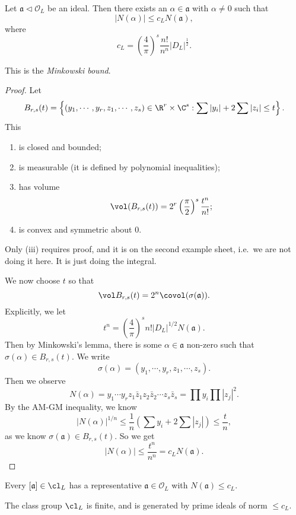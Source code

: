 \documentclass[a4paper]{article}
\begin{document}
\begin{prop}
  Let $\mathfrak{a} \lhd \mathcal{O}_L$ be an ideal. Then there exists an $\alpha \in \mathfrak{a}$ with $\alpha \not= 0$ such that
  \[
    |N(\alpha)| \leq c_L N(\mathfrak{a}),
  \]
  where
  \[
    c_L = \left(\frac{4}{\pi}\right)^s \frac{n!}{n^n} |D_L|^{\frac{1}{2}}.
  \]\qedhere
\end{prop}
This is the \emph{Minkowski bound}.

\begin{proof}
  Let
  \[
    B_{r, s}(t) = \left\{(y_1, \cdots, y_r, z_1, \cdots, z_s) \in \R^r \times \C^s: \sum |y_i| + 2 \sum |z_i| \leq t\right\}.
  \]
  This
  \begin{enumerate}
    \item is closed and bounded;
    \item is measurable (it is defined by polynomial inequalities);
    \item has volume
      \[
        \vol(B_{r, s}(t)) = 2^r \left(\frac{\pi}{2}\right)^s \frac{t^n}{n!};
      \]
    \item is convex and symmetric about $0$.
  \end{enumerate}
  Only (iii) requires proof, and it is on the second example sheet, i.e.\ we are not doing it here. It is just doing the integral.

  We now choose $t$ so that
  \[
    \vol B_{r, s}(t) = 2^n \covol(\sigma(\mathfrak{a})).
  \]
  Explicitly, we let
  \[
    t^n = \left(\frac{4}{\pi}\right)^s n! |D_L|^{1/2}N(\mathfrak{a}).
  \]
  Then by Minkowski's lemma, there is some $\alpha \in \mathfrak{a}$ non-zero such that $\sigma(\alpha) \in B_{r, s}(t)$. We write
  \[
    \sigma(\alpha) = (y_1, \cdots, y_r, z_1, \cdots, z_s).
  \]
  Then we observe
  \[
    N(\alpha) = y_1\cdots y_r z_1 \bar{z}_1 z_2 \bar{z}_2 \cdots z_s \bar{z}_s = \prod y_i \prod|z_j|^2.
  \]
  By the AM-GM inequality, we know
  \[
    |N(\alpha)|^{1/n} \leq \frac{1}{n}\left(\sum y_i + 2 \sum |z_j|\right) \leq \frac{t}{n},
  \]
  as we know $\sigma(\mathfrak{a}) \in B_{r, s}(t)$. So we get
  \[
    |N(\alpha)| \leq \frac{t^n}{n^n} = c_L N(\mathfrak{a}).
  \]
\end{proof}

\begin{cor}
  Every $[\mathfrak{a}] \in \cl_L$ has a representative $\mathfrak{a} \in \mathcal{O}_L$ with $N(\mathfrak{a}) \leq c_L$.
\end{cor}

\begin{thm}[Dirichlet]
  The class group $\cl_L$ is finite, and is generated by prime ideals of norm $\leq c_L$.
\end{thm}
\end{document}
